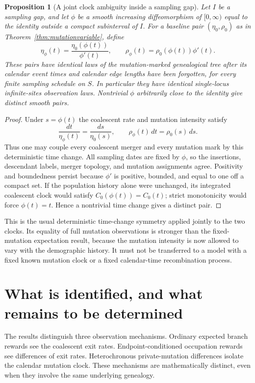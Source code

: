 \documentclass[11pt]{article}
\newtheorem{proposition}[theorem]{Proposition}
\theoremstyle{definition}
\theoremstyle{remark}
\numberwithin{equation}{section}
\begin{document}
\begin{proposition}[A joint clock ambiguity inside a sampling gap]
\label{prop:jointgauge}
Let $I$ be a sampling gap, and let $\phi$ be a smooth increasing
diffeomorphism of $[0,\infty)$ equal to the identity outside a compact
subinterval of $I$. For a baseline pair $(\eta_0,\rho_0)$ as in
Theorem~\ref{thm:mutationvariable}, define
\[
 \eta_\phi(t)=\frac{\eta_0(\phi(t))}{\phi'(t)},\qquad
 \rho_\phi(t)=\rho_0(\phi(t))\phi'(t).
\]
These pairs have identical laws of the mutation-marked genealogical
tree after its calendar event times and calendar edge lengths have been
forgotten, for every
finite sampling schedule on $S$. In particular they have identical
single-locus infinite-sites observation laws. Nontrivial $\phi$
arbitrarily close to the identity give distinct smooth pairs.
\end{proposition}
\begin{proof}
Under $s=\phi(t)$ the coalescent rate and mutation intensity satisfy
\[
 \frac{dt}{\eta_\phi(t)}=\frac{ds}{\eta_0(s)},\qquad
 \rho_\phi(t)\,dt=\rho_0(s)\,ds.
\]
Thus one may couple every coalescent merger and every mutation mark
by this deterministic time change. All sampling dates are fixed by
$\phi$, so the insertions, descendant labels, merger topology, and
mutation assignments agree. Positivity and boundedness persist because
$\phi'$ is positive, bounded, and equal to one off a compact set.
If the population history alone were unchanged, its integrated
coalescent clock would satisfy $C_0(\phi(t))=C_0(t)$; strict
monotonicity would force $\phi(t)=t$. Hence a nontrivial time change
gives a distinct pair.
\end{proof}

This is the usual deterministic time-change symmetry applied jointly
to the two clocks. Its equality of full mutation observations is
stronger than the fixed-mutation expectation result, because the
mutation intensity is now allowed to vary with the demographic
history. It must not be transferred to a model with a fixed known
mutation clock or a fixed calendar-time recombination process.



\section{What is identified, and what remains to be determined}
\label{sec:discussion}

The results distinguish three observation mechanisms. Ordinary expected
branch rewards see the coalescent exit rates. Endpoint-conditioned
occupation rewards see differences of exit rates. Heterochronous
private-mutation differences isolate the calendar mutation clock.
These mechanisms are mathematically distinct, even when they involve
the same underlying genealogy.
\end{document}
